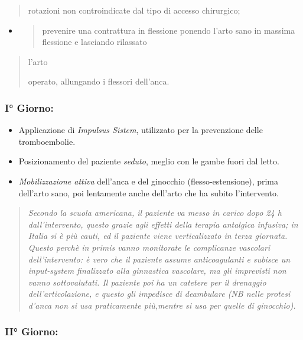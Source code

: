 \documentclass[]{article}
\begin{document}
\begin{quote}
rotazioni non controindicate dal tipo di accesso chirurgico;
\end{quote}

\begin{itemize}
\item
  \begin{quote}
  prevenire una contrattura in flessione ponendo l'arto sano in massima
  flessione e lasciando rilassato
  \end{quote}
\end{itemize}

\begin{quote}
l'arto

operato, allungando i flessori dell'anca.
\end{quote}

\subsubsection{I° Giorno:}\label{i-giorno}

\begin{itemize}
\item
  Applicazione di \emph{Impulsus Sistem}, utilizzato per la prevenzione
  delle tromboembolie.
\item
  Posizionamento del paziente \emph{seduto}, meglio con le gambe fuori
  dal letto.
\item
  \emph{Mobilizzazione attiva} dell'anca e del ginocchio
  (flesso-estensione), prima dell'arto sano, poi lentamente anche
  dell'arto che ha subito l'intervento.
\end{itemize}

\begin{quote}
\emph{Secondo la scuola americana, il paziente va messo in carico dopo
24 h dall'intervento, questo grazie agli effetti della terapia antalgica
infusiva; in Italia si è più cauti, ed il paziente viene verticalizzato
in terza giornata. Questo perchè in primis vanno monitorate le
complicanze vascolari dell'intervento: è vero che il paziente assume
anticoagulanti e subisce un input-system finalizzato alla ginnastica
vascolare, ma gli imprevisti non vanno sottovalutati. Il paziente poi ha
un catetere per il drenaggio dell'articolazione, e questo gli impedisce
di deambulare (NB nelle protesi d'anca non si usa praticamente
più,mentre si usa per quelle di ginocchio).}
\end{quote}

\subsubsection{II° Giorno:}\label{ii-giorno}
\end{document}
